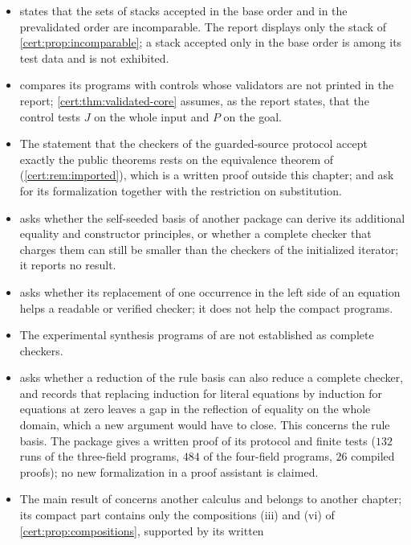 \begin{itemize}
with the explicit type test.
\item {} states that the sets of stacks accepted
in the base order and in the prevalidated order are incomparable. The report
displays only the stack of \cref{cert:prop:incomparable}; a stack accepted
only in the base order is among its test data and is not exhibited.
\item {} compares its programs with controls whose
validators are not printed in the report; \cref{cert:thm:validated-core}
assumes, as the report states, that the control tests $J$ on the whole input
and $P$ on the goal.
\item The statement that the checkers of the guarded-source protocol accept
exactly the public theorems rests on the equivalence theorem of
 (\cref{cert:rem:imported}), which is a written proof
outside this chapter;  and  ask
for its formalization together with the restriction on substitution.
\item {} asks whether the self-seeded basis of another
package can derive its additional equality and constructor principles, or
whether a complete checker that charges them can still be smaller than the
checkers of the initialized iterator; it reports no result.
\item {} asks whether its replacement of one occurrence
in the left side of an equation helps a readable or verified checker; it
does not help the compact programs.
\item The experimental synthesis programs of 
are not established as complete checkers.
\item {} asks whether a reduction of the rule basis can also
reduce a complete checker, and records that replacing induction for literal
equations by induction for equations at zero leaves a gap in the reflection of
equality on the whole domain, which a new argument would have to close. This
concerns the rule basis. The package gives a written proof of its protocol and
finite tests ($132$ runs of the three-field programs, $484$ of the four-field
programs, $26$ compiled proofs); no new formalization in a proof assistant is
claimed.
\item The main result of  concerns another calculus and
belongs to another chapter; its compact part contains only the compositions
(iii) and (vi) of \cref{cert:prop:compositions}, supported by its written

\end{itemize}

